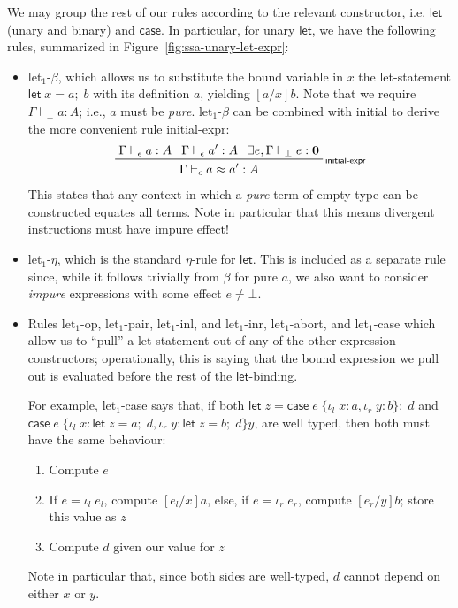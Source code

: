 \documentclass[acmsmall,screen,review]{acmart}
\newcommand{\mb}[1]{\ensuremath{\mathbf{#1}}}
\newcommand{\ms}[1]{\ensuremath{\mathsf{#1}}}
\newcommand{\lto}{:}
\newcommand{\linl}[1]{\iota_l\;{#1}}
\newcommand{\linr}[1]{\iota_r\;{#1}}
\newcommand{\letexpr}[3]{\ensuremath{\ms{let}\;#1 = #2;\;#3}}
\newcommand{\caseexpr}[5]{\ms{case}\;#1\;\{\linl{#2} \lto #3, \linr{#4} \lto #5\}}
\newcommand{\rle}[1]{{\scriptsize\textsf{#1}}}
\newcommand{\hasty}[4]{#1 \vdash_{#2} #3: {#4}}
\newcommand{\teqv}{\approx}
\newcommand{\tmeq}[5]{#1 \vdash_{#2} #3 \teqv #4 : {#5}}
\newcommand{\brle}[1]{{\scriptsize\textsf{#1}}}
\begin{document}
We may group the rest of our rules according to the relevant constructor, i.e. $\ms{let}$ (unary and
binary) and $\ms{case}$. In particular, for unary $\ms{let}$, we have the following rules,
summarized in Figure~\ref{fig:ssa-unary-let-expr}:
\begin{itemize}
  \item \brle{let$_1$-$\beta$}, which allows us to substitute the bound variable in $x$ the
  let-statement $\letexpr{x}{a}{b}$ with its definition $a$, yielding $[a/x]b$. Note that we require
  $\hasty{\Gamma}{\bot}{a}{A}$; i.e., $a$ must be \emph{pure}.
  \brle{let$_1$-$\beta$} can be combined with \brle{initial} to derive the more convenient
  rule \brle{initial-expr}:
  \begin{gather*}
    \prftree[r]{\rle{initial-expr}} 
      {\hasty{\Gamma}{\epsilon}{a}{A}}
      {\hasty{\Gamma}{\epsilon}{a'}{A}}
      {\exists e, \hasty{\Gamma}{\bot}{e}{\mb{0}}}
      {\tmeq{\Gamma}{\epsilon}{a}{a'}{A}}
  \end{gather*}
  This states that any context in which a \emph{pure} term of empty type can be constructed equates
  all terms. Note in particular that this means divergent instructions must have impure effect!

  \item \brle{let$_1$-$\eta$}, which is the standard $\eta$-rule for \ms{let}. This is included as a
  separate rule since, while it follows trivially from $\beta$ for pure $a$, we also want to
  consider \emph{impure} expressions with some effect $e \neq \bot$.
  
  \item Rules \brle{let$_1$-op}, \brle{let$_1$-pair}, \brle{let$_1$-inl}, and \brle{let$_1$-inr},
  \brle{let$_1$-abort}, and \brle{let$_1$-case} which allow us to ``pull'' a let-statement out of
  any of the other expression constructors; operationally, this is saying that the bound expression
  we pull out is evaluated before the rest of the \ms{let}-binding.
  
  For example, \brle{let$_1$-case} says that, if both
  $\letexpr{z}{\caseexpr{e}{x}{a}{y}{b}}{d}$ and
  $\caseexpr{e}{x}{\letexpr{z}{a}{d}}{y}{\letexpr{z}{b}{d}}{y}$,
  are well typed, then both must have the same behaviour:
  \begin{enumerate}
    \item Compute $e$
    \item If $e = \linl{e_l}$, compute $[e_l/x]a$, else, if $e = \linr{e_r}$, compute $[e_r/y]b$;
          store this value as $z$
    \item Compute $d$ given our value for $z$
  \end{enumerate}
  Note in particular that, since both sides are well-typed, $d$ cannot depend on either $x$ or $y$.
\end{itemize}
\end{document}
